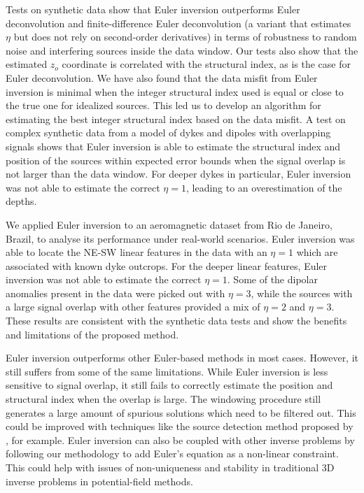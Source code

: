 Tests on synthetic data show that Euler inversion outperforms Euler
deconvolution and finite-dif\-fer\-ence Euler deconvolution (a variant that
estimates $\eta$ but does not rely on second-order derivatives) in terms of
robustness to random noise and interfering sources inside the data window.
Our tests also show that the estimated $z_o$ coordinate is correlated with the
structural index, as is the case for Euler deconvolution.
We have also found that the data misfit from Euler inversion is minimal when
the integer structural index used is equal or close to the true one for
idealized sources.
This led us to develop an algorithm for estimating the best integer structural
index based on the data misfit.
A test on complex synthetic data from a model of dykes and dipoles with
overlapping signals shows that Euler inversion is able to estimate the
structural index and position of the sources within expected error bounds when
the signal overlap is not larger than the data window.
For deeper dykes in particular, Euler inversion was not able to estimate the
correct $\eta=1$, leading to an overestimation of the depths.

We applied Euler inversion to an aeromagnetic dataset from Rio de Janeiro,
Brazil, to analyse its performance under real-world scenarios.
Euler inversion was able to locate the NE-SW linear features in the data with
an $\eta=1$ which are associated with known dyke outcrops.
For the deeper linear features, Euler inversion was not able to estimate the
correct $\eta=1$.
Some of the dipolar anomalies present in the data were picked out with
$\eta=3$, while the sources with a large signal overlap with other features
provided a mix of $\eta=2$ and $\eta=3$.
These results are consistent with the synthetic data tests and show the
benefits and limitations of the proposed method.

Euler inversion outperforms other Euler-based methods in most cases.
However, it still suffers from some of the same limitations.
While Euler inversion is less sensitive to signal overlap, it still fails to
correctly estimate the position and structural index when the overlap is large.
The windowing procedure still generates a large amount of spurious solutions
which need to be filtered out.
This could be improved with techniques like the source detection method
proposed by \citet{Castro2020}, for example.
Euler inversion can also be coupled with other inverse problems by following
our methodology to add Euler's equation as a non-linear constraint.
This could help with issues of non-uniqueness and stability in traditional 3D
inverse problems in potential-field methods.

